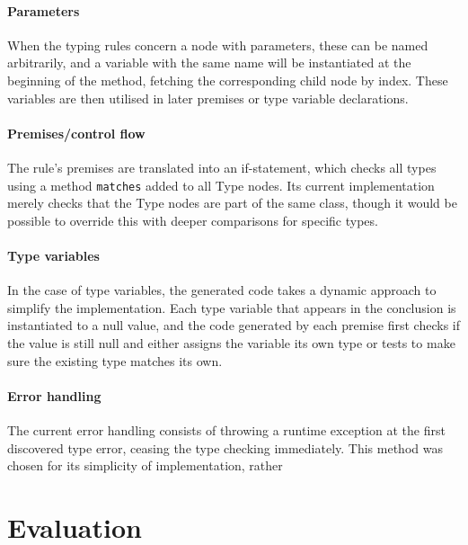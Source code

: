 \documentclass[nofilelist]{cslthse-msc}
\begin{document}
\subsubsection{Parameters}
When the typing rules concern a node with parameters, these can be named arbitrarily, and a variable with the same name will be instantiated at the beginning of the method, fetching the corresponding child node by index.
These variables are then utilised in later premises or type variable declarations.

\subsubsection{Premises/control flow}
The rule's premises are translated into an if-statement, which checks all types using a method \verb|matches| added to all Type nodes.
Its current implementation merely checks that the Type nodes are part of the same class, though it would be possible to override this with deeper comparisons for specific types.

\subsubsection{Type variables}
In the case of type variables, the generated code takes a dynamic approach to simplify the implementation.
Each type variable that appears in the conclusion is instantiated to a null value, and the code generated by each premise first checks if the value is still null and either assigns the variable its own type or tests to make sure the existing type matches its own.

\subsubsection{Error handling}
The current error handling consists of throwing a runtime exception at the first discovered type error, ceasing the type checking immediately.
This method was chosen for its simplicity of implementation, rather 


\chapter{Evaluation} %
\end{document}
